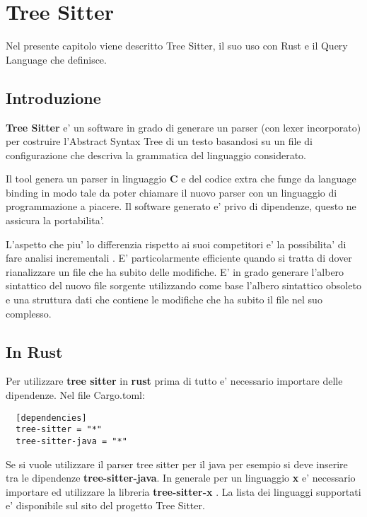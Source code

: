 \chapter{Tree Sitter}

Nel presente capitolo viene descritto Tree Sitter, il suo uso con Rust e il Query Language che definisce.

\section{Introduzione}

\textbf{Tree Sitter} \cite{TreeSitter} e' un software in grado di generare un parser (con lexer incorporato) per costruire l'Abstract Syntax Tree di un testo basandosi su un file di configurazione che descriva la grammatica del linguaggio considerato.

Il tool \cite{TreeSitterCreatingParsers} genera un parser in linguaggio \textbf{C} e del codice extra che funge da language binding in modo tale da poter chiamare il nuovo parser con un linguaggio di programmazione a piacere.
Il software generato e' privo di dipendenze, questo ne assicura la portabilita'.

L'aspetto che piu' lo differenzia rispetto ai suoi competitori e' la possibilita' di fare analisi incrementali \cite{TreeSitterAdvancedParsing}.
E' particolarmente efficiente quando si tratta di dover rianalizzare un file che ha subito delle modifiche.
E' in grado generare l'albero sintattico del nuovo file sorgente utilizzando come base l'albero sintattico obsoleto e una struttura dati che contiene le modifiche che ha subito il file nel suo complesso.

\section{In Rust}

Per utilizzare \textbf{tree sitter} in \textbf{rust} \cite{TreeSitterCrate} prima di tutto e' necessario importare delle dipendenze. Nel file Cargo.toml:

\begin{lstlisting}
  [dependencies]
  tree-sitter = "*"
  tree-sitter-java = "*"
\end{lstlisting}

Se si vuole utilizzare il parser tree sitter per il java per esempio si deve inserire tra le dipendenze \textbf{tree-sitter-java}.
In generale per un linguaggio \textbf{x} e' necessario importare ed utilizzare la libreria \textbf{tree-sitter-x} \cite{TreeSitterRustGrammars}.
La lista dei linguaggi supportati e' disponibile sul sito del progetto Tree Sitter.

